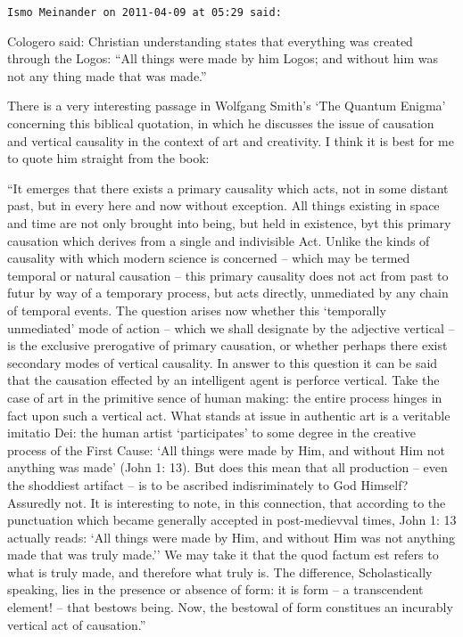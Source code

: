 \begin{footnotesize}
\begin{sffamily}
\hfill

\texttt{Ismo Meinander on 2011-04-09 at 05:29 said:}

Cologero said: Christian understanding states that everything was created through the Logos: ``All things were made by him Logos; and without him was not any thing made that was made.''

There is a very interesting passage in Wolfgang Smith's `The Quantum Enigma' concerning this biblical quotation, in which he discusses the issue of causation and vertical causality in the context of art and creativity. I think it is best for me to quote him straight from the book:

``It emerges that there exists a primary causality which acts, not in some distant past, but in every here and now without exception. All things existing in space and time are not only brought into being, but held in existence, byt this primary causation which derives from a single and indivisible Act. Unlike the kinds of causality with which modern science is concerned -- which may be termed temporal or natural causation -- this primary causality does not act from past to futur by way of a temporary process, but acts directly, unmediated by any chain of temporal events. The question arises now whether this `temporally unmediated' mode of action -- which we shall designate by the adjective vertical -- is the exclusive prerogative of primary causation, or whether perhaps there exist secondary modes of vertical causality. In answer to this question it can be said that the causation effected by an intelligent agent is perforce vertical. Take the case of art in the primitive sence of human making: the entire process hinges in fact upon such a vertical act. What stands at issue in authentic art is a veritable imitatio Dei: the human artist `participates' to some degree in the creative process of the First Cause: `All things were made by Him, and without Him not anything was made' (John 1: 13). But does this mean that all production -- even the shoddiest artifact -- is to be ascribed indisriminately to God Himself? Assuredly not. It is interesting to note, in this connection, that according to the punctuation which became generally accepted in post-medievval times, John 1: 13 actually reads: `All things were made by Him, and without Him was not anything made that was truly made.'' We may take it that the quod factum est refers to what is truly made, and therefore what truly is. The difference, Scholastically speaking, lies in the presence or absence of form: it is form -- a transcendent element! -- that bestows being. Now, the bestowal of form constitues an incurably vertical act of causation.''


\end{sffamily}
\end{footnotesize}
